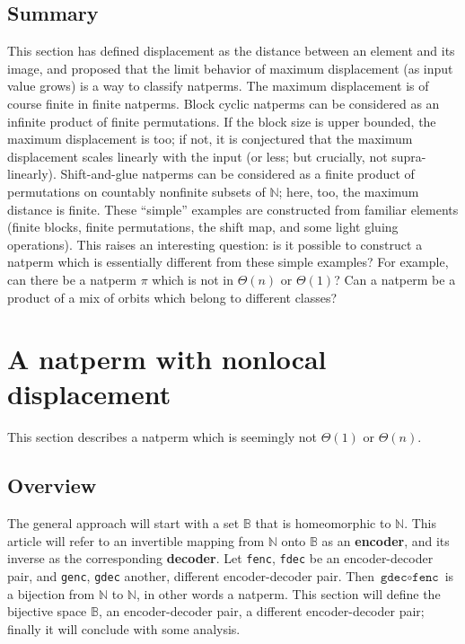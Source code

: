 \documentclass[12pt,reqno]{article}
\begin{document}
\subsection{Summary}

This section has defined displacement as the distance between an element and its image, and proposed that the limit behavior of maximum displacement (as input value grows) is a way to classify natperms. The maximum displacement is of course finite in finite natperms. Block cyclic natperms can be considered as an infinite product of finite permutations. If the block size is upper bounded, the maximum displacement is too; if not, it is conjectured that the maximum displacement scales linearly with the input (or less; but crucially, not supra-linearly). Shift-and-glue natperms can be considered as a finite product of permutations on countably nonfinite subsets of $\mathbb{N}$; here, too, the maximum distance is finite. These ``simple'' examples are constructed from familiar elements (finite blocks, finite permutations, the shift map, and some light gluing operations). This raises an interesting question: is it possible to construct a natperm which is essentially different from these simple examples? For example, can there be a natperm $\pi$ which is not in $\Theta(n)$ or $\Theta(1)$? Can a natperm be a product of a mix of orbits which belong to different classes?

\section{A natperm with nonlocal displacement}

This section describes a natperm which is seemingly not $\Theta(1)$ or $\Theta(n)$.

\subsection{Overview}

The general approach will start with a set $\mathbb{B}$ that is homeomorphic to $\mathbb{N}$. This article will refer to an invertible mapping from $\mathbb{N}$ onto $\mathbb{B}$ as an \textbf{encoder}, and its inverse as the corresponding \textbf{decoder}. Let \texttt{fenc}, \texttt{fdec} be an encoder-decoder pair, and \texttt{genc}, \texttt{gdec} another, different encoder-decoder pair. Then $\texttt{gdec} \circ \texttt{fenc}$ is a bijection from $\mathbb{N}$ to $\mathbb{N}$, in other words a natperm. This section will define the bijective space $\mathbb{B}$, an encoder-decoder pair, a different encoder-decoder pair; finally it will conclude with some analysis.
\end{document}
